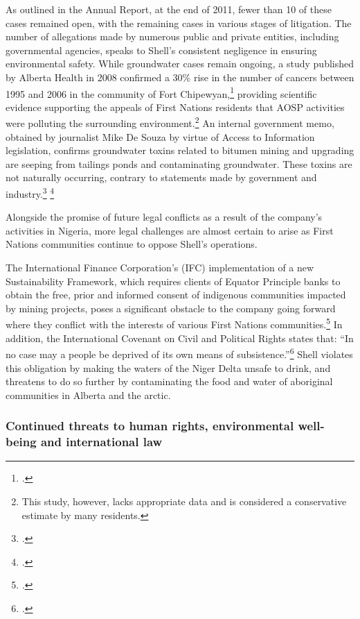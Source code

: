 \begin{description}
As outlined in the Annual Report, at the end of 2011, fewer than 10 of these cases remained open, with the remaining cases in various stages of litigation. The number of allegations made by numerous public and private entities, including governmental agencies, speaks to Shell's consistent negligence in ensuring environmental safety. While groundwater cases remain ongoing, a study published by Alberta Health in 2008 confirmed a 30\% rise in the number of cancers between 1995 and 2006 in the community of Fort Chipewyan,\footcite[][]{RiskingRuin_2012} providing scientific evidence supporting the appeals of First Nations residents that AOSP activities were polluting the surrounding environment.\footnote{This study, however, lacks appropriate data and is considered a conservative estimate by many residents.} An internal government memo, obtained by journalist Mike De Souza by virtue of Access to Information legislation, confirms groundwater toxins related to bitumen mining and upgrading are seeping from tailings ponds and contaminating groundwater. These toxins are not naturally occurring, contrary to statements made by government and industry.\footcite[][]{Memorandum_2012} \footcite[See also: ][]{TailingsLeaking}
\end{description}


Alongside the promise of future legal conflicts as a result of the company's activities in Nigeria, more legal challenges are almost certain to arise as First Nations communities continue to oppose Shell's operations. 



The International Finance Corporation's (IFC) implementation of a new Sustainability Framework, which requires clients of Equator Principle banks to obtain the free, prior and informed consent of indigenous communities impacted by mining projects, poses a significant obstacle to the company going forward where they conflict with the interests of various First Nations communities.\footcite[][]{Sosa_2011}
In addition, the International Covenant on Civil and Political Rights states that: ``In no case may a people be deprived of its own means of subsistence.''\footcite[Part I, Article I (2)][]{CivilAndPolitical}
Shell violates this obligation by making the waters of the Niger Delta unsafe to drink, and threatens to do so further by contaminating the food and water of aboriginal communities in Alberta and the arctic.


	\subsubsection{Continued threats to human rights, environmental well-being and international law}
	

